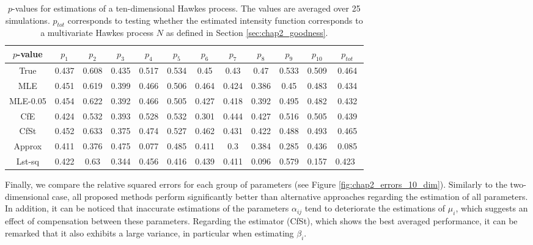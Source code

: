     \begin{table}[!ht]
    \begin{center}
    \setlength{\tabcolsep}{5pt}
    \centering
    \begin{tabular}{c|cccccccccc|c}
         $p$-value & $p_1$ & $p_2$ & $p_3$ & $p_4$ & $p_5$ & $p_6$ & $p_7$ & $p_8$& $p_9$ & $p_{10}$ & $p_{tot}$\\
         \toprule
         True & 0.437 & 0.608 & 0.435 & 0.517 & 0.534 & 0.45 & 0.43 & 0.47 & 0.533 & 0.509 & 0.464\\
         \midrule
         MLE & 0.451 & 0.619 & 0.399 & 0.466 & 0.506 & 0.464 & 0.424 & 0.386 & 0.45 & 0.483 & 0.434\\
         \midrule
         MLE-0.05 & 0.454 & 0.622 & 0.392 & 0.466 & 0.505 & 0.427 & 0.418 & 0.392 & 0.495 & 0.482 & 0.432 \\
         CfE & 0.424 & 0.532 & 0.393 & 0.528 & 0.532 & 0.301 & 0.444 & 0.427 & 0.516 & 0.505 & 0.439\\
         CfSt & 0.452 & 0.633 & 0.375 & 0.474 & 0.527 & 0.462 & 0.431 & 0.422 & 0.488 & 0.493 & 0.465\\
         \midrule
         Approx & 0.411 & 0.376 & 0.475 & 0.077 & 0.485 & 0.411 & 0.3 & 0.384 & 0.285 & 0.436 & 0.085\\
         Lst-sq & 0.422 & 0.63 & 0.344 & 0.456 & 0.416 & 0.439 & 0.411 & 0.096 & 0.579 & 0.157 & 0.423\
    \end{tabular}    
    \caption{$p$-values for estimations of a ten-dimensional Hawkes process. The values are averaged over 25 simulations. $p_{tot}$ corresponds to testing whether the estimated intensity function corresponds to a multivariate Hawkes process $N$ as defined in Section \ref{sec:chap2_goodness}.}
    \label{tab:chap2_p_values_10}
    \end{center}
    \end{table}

Finally, we compare the relative squared errors for each group of parameters (see Figure \ref{fig:chap2_errors_10_dim}). Similarly to the two-dimensional case, all proposed methods perform significantly better than alternative approaches regarding the estimation of all parameters.
In addition, it can be noticed that inaccurate estimations of the parameters $\alpha_{ij}$ tend to deteriorate the estimations of $\mu_i$, which suggests an effect of compensation between these parameters.
Regarding the estimator (CfSt), which shows the best averaged performance, it can be remarked that it also exhibits a large variance, in particular when estimating $\beta_i$. 

